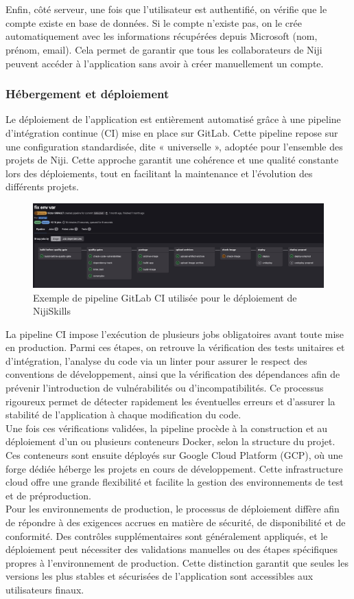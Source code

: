 \documentclass[12pt]{article}
\begin{document}
\\\\
Enfin, côté serveur, une fois que l'utilisateur est authentifié, on vérifie que le compte existe en base de données. Si le compte n'existe pas, on le crée automatiquement avec les informations récupérées depuis Microsoft (nom, prénom, email). Cela permet de garantir que tous les collaborateurs de Niji peuvent accéder à l'application sans avoir à créer manuellement un compte.
\subsubsection{Hébergement et déploiement}
Le déploiement de l’application est entièrement automatisé grâce à une pipeline d’intégration continue (CI) mise en place sur GitLab. Cette pipeline repose sur une configuration standardisée, dite « universelle », adoptée pour l’ensemble des projets de Niji. Cette approche garantit une cohérence et une qualité constante lors des déploiements, tout en facilitant la maintenance et l’évolution des différents projets.
\\
\begin{figure}[H]
  \centering
  \includegraphics[width=\textwidth]{img/gitlab-ci-pipeline.png}
  \caption{Exemple de pipeline GitLab CI utilisée pour le déploiement de NijiSkills}
\end{figure}
\noindent
La pipeline CI impose l’exécution de plusieurs jobs obligatoires avant toute mise en production. Parmi ces étapes, on retrouve la vérification des tests unitaires et d’intégration, l’analyse du code via un linter pour assurer le respect des conventions de développement, ainsi que la vérification des dépendances afin de prévenir l’introduction de vulnérabilités ou d’incompatibilités. Ce processus rigoureux permet de détecter rapidement les éventuelles erreurs et d’assurer la stabilité de l’application à chaque modification du code.
\\
Une fois ces vérifications validées, la pipeline procède à la construction et au déploiement d’un ou plusieurs conteneurs Docker, selon la structure du projet. Ces conteneurs sont ensuite déployés sur Google Cloud Platform (GCP), où une forge dédiée héberge les projets en cours de développement. Cette infrastructure cloud offre une grande flexibilité et facilite la gestion des environnements de test et de préproduction.
\\
Pour les environnements de production, le processus de déploiement diffère afin de répondre à des exigences accrues en matière de sécurité, de disponibilité et de conformité. Des contrôles supplémentaires sont généralement appliqués, et le déploiement peut nécessiter des validations manuelles ou des étapes spécifiques propres à l’environnement de production. Cette distinction garantit que seules les versions les plus stables et sécurisées de l’application sont accessibles aux utilisateurs finaux.
\end{document}
